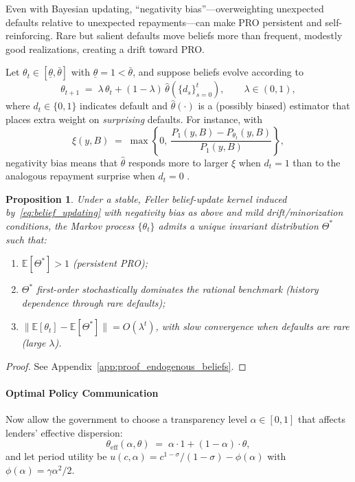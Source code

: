 \documentclass[12pt]{article}
\theoremstyle{plain}
\newtheorem{proposition}{Proposition}
\newcommand{\E}{\mathbb{E}}
\begin{document}
Even with Bayesian updating, ``negativity bias''---overweighting unexpected
defaults relative to unexpected repayments---can make PRO persistent and
self-reinforcing. Rare but salient defaults move beliefs more than frequent,
modestly good realizations, creating a drift toward PRO.

Let $\theta_t\in[\underline\theta,\bar\theta]$ with
$\underline\theta=1<\bar\theta$, and suppose beliefs evolve according to
\begin{equation}
	\theta_{t+1}\;=\; \lambda\,\theta_t + (1-\lambda)\,\widehat\theta(\{d_s\}_{s=0}^t),
	\qquad \lambda\in(0,1),
	\label{eq:belief_updating}
\end{equation}
where $d_t\in\{0,1\}$ indicates default and $\widehat\theta(\cdot)$ is a (possibly biased) estimator that places extra weight on \emph{surprising} defaults. For instance, with
\begin{equation}
	\xi(y,B)\;=\;\max\!\left\{0,\ \frac{P_1(y,B)-P_{\theta_t}(y,B)}{P_1(y,B)}\right\},
	\label{eq:surprise_intensity}
\end{equation}
negativity bias means that $\widehat\theta$ responds more to larger $\xi$ when $d_t=1$ than to the analogous repayment surprise when $d_t=0$  \citep{BaumeisterBratslavskyFinkenauer2001,BordaloGennaioliShleifer2018}.

\begin{proposition}\label{prop:endogenous_beliefs}
	Under a stable, Feller belief-update kernel induced by~\eqref{eq:belief_updating} with negativity bias as above and mild drift/minorization conditions, the Markov process $\{\theta_t\}$ admits a unique invariant distribution $\Theta^*$ such that:
	\begin{enumerate}
		\item[\textbf{(i)}] $\E[\Theta^*]>1$ (persistent PRO);
		\item[\textbf{(ii)}] $\Theta^*$ first-order stochastically dominates the rational benchmark (history dependence through rare defaults);
		\item[\textbf{(iii)}] $\|\E[\theta_t]-\E[\Theta^*]\|=O(\lambda^t)$, with slow convergence when defaults are rare (large $\lambda$).
	\end{enumerate}
\end{proposition}

\begin{proof}
	See Appendix~\ref{app:proof_endogenous_beliefs}.
\end{proof}

\paragraph{Optimal Policy Communication}
Now allow the government to choose a transparency level $\alpha\in[0,1]$ that
affects lenders' effective dispersion:
\begin{equation}
	\theta_{\mathrm{eff}}(\alpha,\theta)\;=\;\alpha\cdot 1 + (1-\alpha)\cdot \theta,
	\label{eq:effective_theta}
\end{equation}
and let period utility be $u(c,\alpha)=c^{1-\sigma}/(1-\sigma)-\phi(\alpha)$ with $\phi(\alpha)=\gamma\alpha^2/2$.
\end{document}
